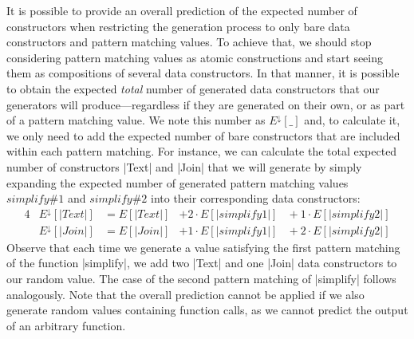 It is possible to provide an overall prediction of the expected number of
constructors when restricting the generation process to only bare data
constructors and pattern matching values.
%
To achieve that, we should stop considering pattern matching values as atomic
constructions and start seeing them as compositions of several data
constructors.
%
In that manner, it is possible to obtain the expected \emph{total} number of
generated data constructors that our generators will produce---regardless if they
are generated on their own, or as part of a pattern matching value.
%
We note this number as $E^\downarrow\![\_]$ and, to calculate it, we only need
to add the expected number of bare constructors that are included within each
pattern matching.
%
For instance, we can calculate the total expected number of constructors |Text|
and |Join| that we will generate by simply expanding the expected number of
generated pattern matching values $simplify\#1$ and $simplify\#2$ into their
corresponding data constructors:
%
{\small
  \begin{alignat*}{4}
    &E^\downarrow\!\left[ |Text| \right]
    &= E\left[ |Text| \right]
      &+ 2 \cdot E\!\left[ |simplify1| \right]\
      &+\ 1 \cdot E\!\left[ |simplify2| \right] \\
    &E^\downarrow\!\left[ |Join| \right]
    &= E\left[ |Join| \right]
      &+ 1 \cdot E\!\left[ |simplify1| \right]\
      &+\ 2 \cdot E\!\left[ |simplify2| \right]
  \end{alignat*}
}
%
Observe that each time we generate a value satisfying the first pattern matching
of the function |simplify|, we add two |Text| and one |Join| data constructors
to our random value.
%
The case of the second pattern matching of |simplify| follows analogously.
%
Note that the overall prediction cannot be applied if we also generate random
values containing function calls, as we cannot predict the output of an
arbitrary function.


